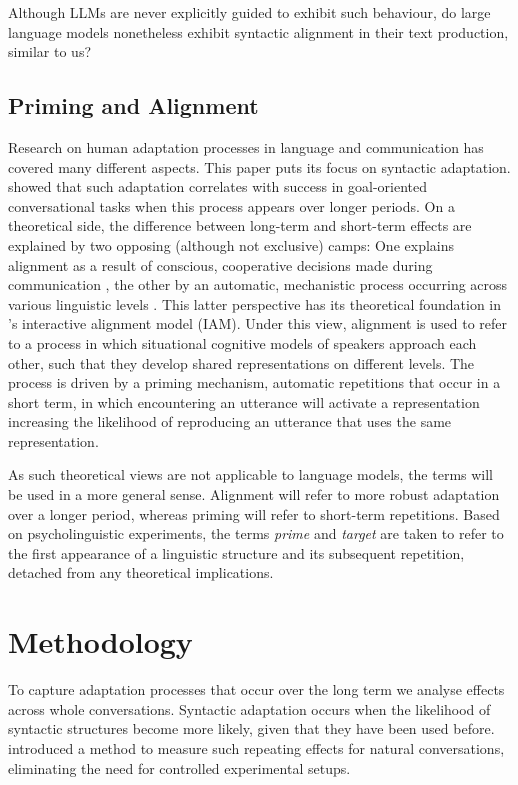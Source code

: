 \documentclass[11pt]{article}
\begin{document}
Although LLMs are never explicitly guided to exhibit such behaviour, do large language models nonetheless exhibit syntactic alignment in their text production, similar to us?

\subsection{Priming and Alignment}
Research on human adaptation processes in language and communication has covered many different aspects. This paper puts its focus on syntactic adaptation. \citealp{reitter2008context} showed that such adaptation correlates with success in goal-oriented conversational tasks when this process appears over longer periods.
On a theoretical side, the difference between long-term and short-term effects are explained by two opposing (although not exclusive) camps: One explains alignment as a result of conscious, cooperative decisions made during communication \cite{brennan1996conceptual_pacts}, the other by an automatic, mechanistic process occurring across various linguistic levels \cite{Rasenberg2020framework}. This latter perspective has its theoretical foundation in \citealp{Pickering_Garrod_2004}'s interactive alignment model (IAM). Under this view, alignment is used to refer to a process in which situational cognitive models of speakers approach each other, such that they develop shared representations on different levels. The process is driven by a priming mechanism, automatic repetitions that occur in a short term, in which encountering an utterance will activate a representation increasing the likelihood of reproducing an utterance that uses the same representation.

As such theoretical views are not applicable to language models, the terms will be used in a more general sense.
Alignment will refer to more robust adaptation over a longer period, whereas priming will refer to short-term repetitions.
Based on psycholinguistic experiments, the terms \textit{prime} and \textit{target} are taken to refer to the first appearance of a linguistic structure and its subsequent repetition, detached from any theoretical implications.

\section{Methodology}\label{sec:methodology}
To capture adaptation processes that occur over the long term we analyse effects across whole conversations. Syntactic adaptation occurs when the likelihood of syntactic structures become more likely, given that they have been used before. \citealp{reitter2008context} introduced a method to measure such repeating effects for natural conversations, eliminating the need for controlled experimental setups.
\end{document}
